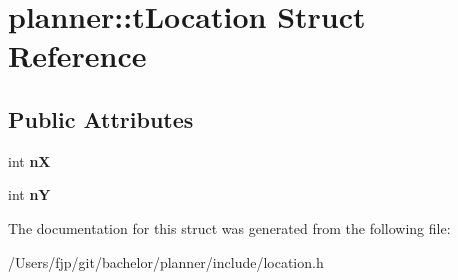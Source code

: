 \hypertarget{structplanner_1_1t_location}{}\section{planner\+:\+:t\+Location Struct Reference}
\label{structplanner_1_1t_location}
\subsection*{Public Attributes}
\begin{DoxyCompactItemize}
\item 
\mbox{\label{structplanner_1_1t_location_aca6603f36eb5d71b738ec085080d4f76}} 
int {\bfseries nX}
\item 
\mbox{\label{structplanner_1_1t_location_a83bc1d843b7603e1fc9913001b41421a}} 
int {\bfseries nY}
\end{DoxyCompactItemize}


The documentation for this struct was generated from the following file\+:\begin{DoxyCompactItemize}
\item 
/\+Users/fjp/git/bachelor/planner/include/location.\+h\end{DoxyCompactItemize}
